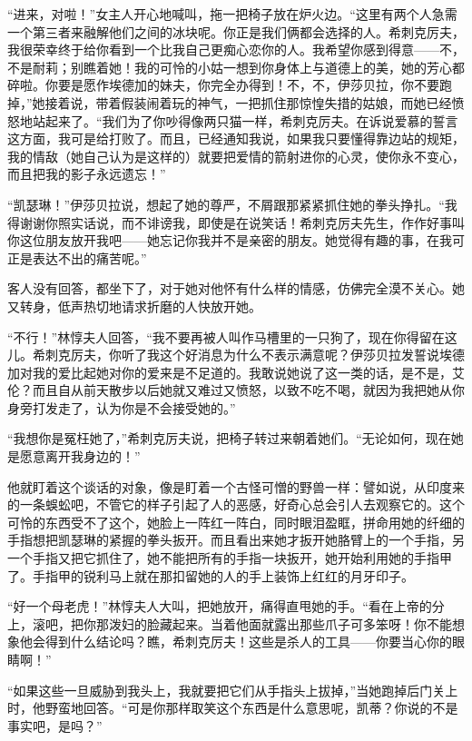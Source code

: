 \par “进来，对啦！”女主人开心地喊叫，拖一把椅子放在炉火边。“这里有两个人急需一个第三者来融解他们之间的冰块呢。你正是我们俩都会选择的人。希刺克厉夫，我很荣幸终于给你看到一个比我自己更痴心恋你的人。我希望你感到得意——不，不是耐莉；别瞧着她！我的可怜的小姑一想到你身体上与道德上的美，她的芳心都碎啦。你要是愿作埃德加的妹夫，你完全办得到！不，不，伊莎贝拉，你不要跑掉，”她接着说，带着假装闹着玩的神气，一把抓住那惊惶失措的姑娘，而她已经愤怒地站起来了。“我们为了你吵得像两只猫一样，希刺克厉夫。在诉说爱慕的誓言这方面，我可是给打败了。而且，已经通知我说，如果我只要懂得靠边站的规矩，我的情敌（她自己认为是这样的）就要把爱情的箭射进你的心灵，使你永不变心，而且把我的影子永远遗忘！”
\par “凯瑟琳！”伊莎贝拉说，想起了她的尊严，不屑跟那紧紧抓住她的拳头挣扎。“我得谢谢你照实话说，而不诽谤我，即使是在说笑话！希刺克厉夫先生，作作好事叫你这位朋友放开我吧——她忘记你我并不是亲密的朋友。她觉得有趣的事，在我可正是表达不出的痛苦呢。”
\par 客人没有回答，都坐下了，对于她对他怀有什么样的情感，仿佛完全漠不关心。她又转身，低声热切地请求折磨的人快放开她。
\par “不行！”林惇夫人回答，“我不要再被人叫作马槽里的一只狗了，现在你得留在这儿。希刺克厉夫，你听了我这个好消息为什么不表示满意呢？伊莎贝拉发誓说埃德加对我的爱比起她对你的爱来是不足道的。我敢说她说了这一类的话，是不是，艾伦？而且自从前天散步以后她就又难过又愤怒，以致不吃不喝，就因为我把她从你身旁打发走了，认为你是不会接受她的。”
\par “我想你是冤枉她了，”希刺克厉夫说，把椅子转过来朝着她们。“无论如何，现在她是愿意离开我身边的！”
\par 他就盯着这个谈话的对象，像是盯着一个古怪可憎的野兽一样：譬如说，从印度来的一条蜈蚣吧，不管它的样子引起了人的恶感，好奇心总会引人去观察它的。这个可怜的东西受不了这个，她脸上一阵红一阵白，同时眼泪盈眶，拼命用她的纤细的手指想把凯瑟琳的紧握的拳头扳开。而且看出来她才扳开她胳臂上的一个手指，另一个手指又把它抓住了，她不能把所有的手指一块扳开，她开始利用她的手指甲了。手指甲的锐利马上就在那扣留她的人的手上装饰上红红的月牙印子。
\par “好一个母老虎！”林惇夫人大叫，把她放开，痛得直甩她的手。“看在上帝的分上，滚吧，把你那泼妇的脸藏起来。当着他面就露出那些爪子可多笨呀！你不能想象他会得到什么结论吗？瞧，希刺克厉夫！这些是杀人的工具——你要当心你的眼睛啊！”
\par “如果这些一旦威胁到我头上，我就要把它们从手指头上拔掉，”当她跑掉后门关上时，他野蛮地回答。“可是你那样取笑这个东西是什么意思呢，凯蒂？你说的不是事实吧，是吗？”
